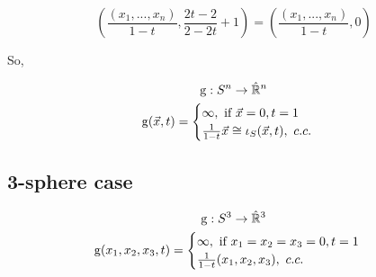 \begin{equation*}
    \left( \frac{(x_1, ..., x_n)}{1-t}, \frac{2t-2}{2-2t}+1 \right) = \left( \frac{(x_1, ..., x_n)}{1-t}, 0 \right)
\end{equation*}

So,

\begin{gather*}
\operatorname{g} : S^n \rightarrow \hat{\mathbb{R}}^n \\
\operatorname{g}(\vec{x}, t) =
    \begin{cases}
        \infty, \text{ if }\vec{x} = 0, t = 1 \\
        \frac{1}{1 - t} \vec{x} \cong \iota_{S}(\vec{x}, t), \mbox{ } c.c.
    \end{cases}
\end{gather*}

%
%
%
%

\subsection{3-sphere case}

\begin{gather*}
\operatorname{g} : S^3 \rightarrow \hat{\mathbb{R}}^3 \\
\operatorname{g}(x_1, x_2, x_3, t) =
    \begin{cases}
        \infty,\text{ if } x_1 = x_2 = x_3 = 0, t = 1 \\
        \frac{1}{1 - t} (x_1, x_2, x_3), \text{ } c.c.
    \end{cases}
\end{gather*}


